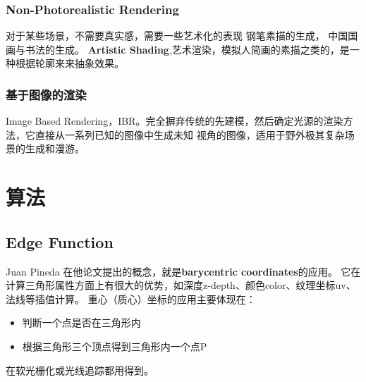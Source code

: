 \subsubsection{Non-Photorealistic Rendering}
对于某些场景，不需要真实感，需要一些艺术化的表现
钢笔素描的生成，
中国国画与书法的生成。
\newline
\textbf{Artistic Shading},艺术渲染，模拟人简画的素描之类的，是一种根据轮廓来来抽象效果。

\subsubsection{基于图像的渲染}
Image Based Rendering，IBR。完全摒弃传统的先建模，然后确定光源的渲染方法，它直接从一系列已知的图像中生成未知
视角的图像，适用于野外极其复杂场景的生成和漫游。


\clearpage 
\section{ 算法 }

\subsection{ Edge Function }
Juan Pineda \cite{EdgeFunction} 在他论文提出的概念，就是\textbf{barycentric coordinates}的应用。
它在计算三角形属性方面上有很大的优势，如深度z-depth、颜色color、纹理坐标uv、法线等插值计算。
重心（质心）坐标的应用主要体现在：
\begin {itemize}
    \item {判断一个点是否在三角形内}
    \item {根据三角形三个顶点得到三角形内一个点P}
\end {itemize}
在软光栅化或光线追踪都用得到。

